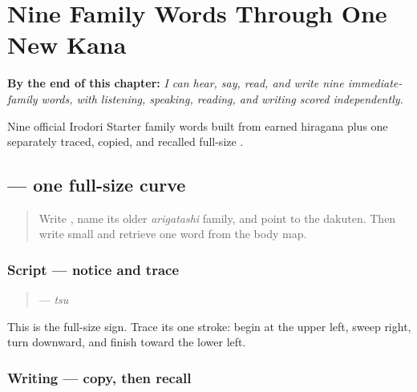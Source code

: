 
\chapter{Nine Family Words Through One New Kana}
\label{ch:ja-family-nine}

\begin{chapteropening}
\textbf{By the end of this chapter:} \emph{I can hear, say, read, and write nine immediate-family words, with listening, speaking, reading, and writing scored independently.}

Nine official Irodori Starter family words built from earned hiragana plus one separately traced, copied, and recalled full-size .
\end{chapteropening}

\section[\texorpdfstring{\ja{つ} (tsu)}{つ (tsu)}]{ — one full-size curve}

\label{lesson:JA-W13-tsu}



\begin{quote}
Write \textbf{}, name its older \emph{arigatashi} family, and point to the dakuten. Then write small \textbf{} and retrieve one word from the body map.
\end{quote}

\subsection*{Script — notice and trace}
\begin{quote}
\textbf{} — \emph{tsu}
\end{quote}

This is the full-size sign. Trace its one stroke: begin at the upper left, sweep right, turn downward, and finish toward the lower left.

\subsection*{Writing — copy, then recall}

